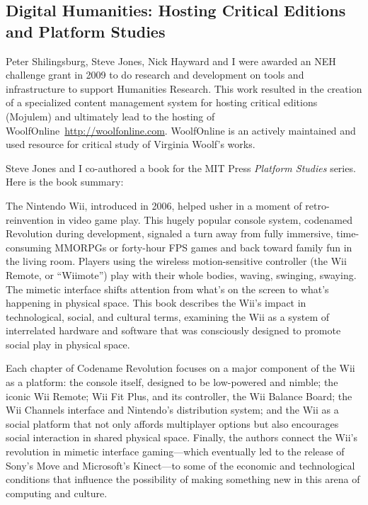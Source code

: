 \subsection{Digital Humanities: Hosting Critical Editions and Platform Studies}

Peter Shilingsburg, Steve Jones, Nick Hayward and I were awarded an NEH challenge grant in 2009 to do research and development on tools and infrastructure to support Humanities Research. This work resulted in the creation of a specialized content management system for hosting critical editions (Mojulem) and ultimately lead to the hosting of WoolfOnline~\href{WoolfOnline}{http://woolfonline.com}. WoolfOnline is an actively maintained and used resource for critical study of Virginia Woolf's works.

\begin{refsection}
    \nocite{george_k._thiruvathukal_e-carrel_2010}
    \nocite{pamela_l._caughie_woolf_2018}
    \printbibliography[heading=none]
\end{refsection}
    
Steve Jones and I co-authored a book for the MIT Press \emph{Platform Studies} series. Here is the book summary:
\vspace{5pt}

The Nintendo Wii, introduced in 2006, helped usher in a moment of retro-reinvention in video game play. This hugely popular console system, codenamed Revolution during development, signaled a turn away from fully immersive, time-consuming MMORPGs or forty-hour FPS games and back toward family fun in the living room. Players using the wireless motion-sensitive controller (the Wii Remote, or “Wiimote”) play with their whole bodies, waving, swinging, swaying. The mimetic interface shifts attention from what's on the screen to what's happening in physical space. This book describes the Wii's impact in technological, social, and cultural terms, examining the Wii as a system of interrelated hardware and software that was consciously designed to promote social play in physical space.
\vspace{5pt}

Each chapter of Codename Revolution focuses on a major component of the Wii as a platform: the console itself, designed to be low-powered and nimble; the iconic Wii Remote; Wii Fit Plus, and its controller, the Wii Balance Board; the Wii Channels interface and Nintendo's distribution system; and the Wii as a social platform that not only affords multiplayer options but also encourages social interaction in shared physical space. Finally, the authors connect the Wii's revolution in mimetic interface gaming—which eventually led to the release of Sony's Move and Microsoft's Kinect—to some of the economic and technological conditions that influence the possibility of making something new in this arena of computing and culture.

